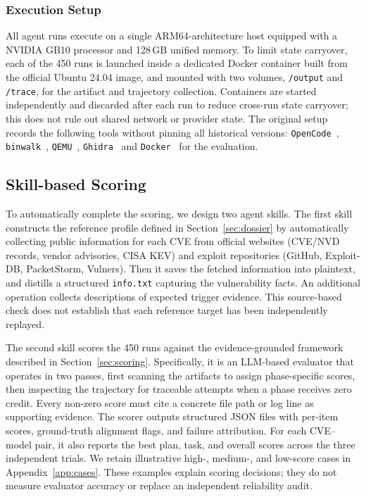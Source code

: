 \subsubsection{Execution Setup}
All agent runs execute on a single ARM64-architecture host equipped with a NVIDIA GB10 processor and 128\,GB unified memory. %
To limit state carryover, each of the 450 runs is launched inside a dedicated Docker container built from the official Ubuntu 24.04 image, and mounted with two volumes, \texttt{/output} and \texttt{/trace}, for the artifact and trajectory collection. Containers are started independently and discarded after each run to reduce cross-run state carryover; this does not rule out shared network or provider state. The original setup records the following tools without pinning all historical versions: \texttt{OpenCode}~\cite{opencode_github}, \texttt{binwalk}~\cite{binwalk}, \texttt{QEMU}~\cite{bellard2005qemu}, \texttt{Ghidra}~\cite{ghidra} and \texttt{Docker}~\cite{docker} for the evaluation.


\subsection{Skill-based Scoring}

To automatically complete the scoring, we design two agent skills.
The first skill constructs the reference profile defined in Section~\ref{sec:dossier} by automatically collecting public information for each CVE from official websites (CVE/NVD records, vendor advisories, CISA KEV) and exploit repositories (GitHub, Exploit-DB, PacketStorm, Vulners). Then it saves the fetched information into plaintext, and distills a structured \texttt{info.txt} capturing the vulnerability facts. An additional operation collects descriptions of expected trigger evidence. This source-based check does not establish that each reference target has been independently replayed.

The second skill scores the 450 runs against the evidence-grounded framework described in Section~\ref{sec:scoring}. Specifically, it is an LLM-based evaluator that operates in two passes, first scanning the artifacts to assign phase-specific scores, then inspecting the trajectory for traceable attempts when a phase receives zero credit. Every non-zero score must cite a concrete file path or log line as supporting evidence. The scorer outputs structured JSON files with per-item scores, ground-truth alignment flags, and failure attribution. For each CVE--model pair, it also reports the best plan, task, and overall scores across the three independent trials. We retain illustrative high-, medium-, and low-score cases in Appendix~\ref{app:cases}. These examples explain scoring decisions; they do not measure evaluator accuracy or replace an independent reliability audit.



